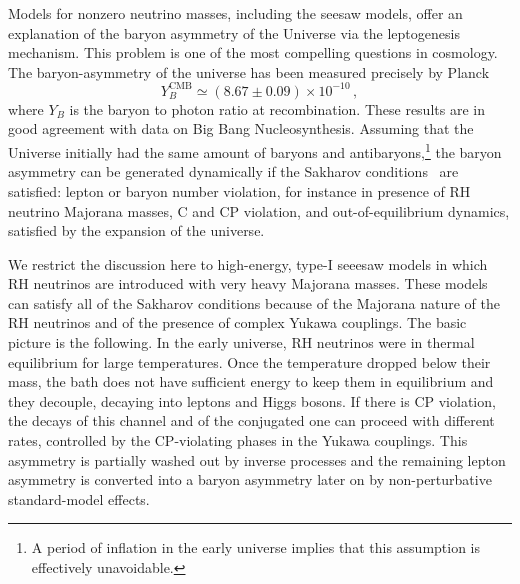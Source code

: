 Models for nonzero neutrino masses, including the seesaw models, offer an explanation of the baryon asymmetry of the Universe via the leptogenesis mechanism. 
This problem is one of the most compelling questions in cosmology. The baryon-asymmetry of the universe has been measured precisely by Planck~\cite{Aghanim:2018eyx}
\begin{equation}
Y_B^{\mathrm{CMB}}\simeq (8.67\pm 0.09) \times 10^{-10}\,,
\end{equation}
where $Y_B$ is the baryon to photon ratio at recombination. These results are in good agreement with data on Big Bang Nucleosynthesis. Assuming that the Universe initially had the same amount of baryons and antibaryons,\footnote{A period of inflation in the early universe implies that this assumption is effectively unavoidable.} the baryon asymmetry can be generated dynamically if the Sakharov conditions~\cite{Sakharov:1967dj} are satisfied: lepton or baryon number violation, for instance in presence of RH neutrino Majorana masses, C and CP violation, and out-of-equilibrium dynamics, satisfied by the expansion of the universe. 

We restrict the discussion here to high-energy, type-I seeesaw models in which RH neutrinos are introduced with very heavy Majorana masses. 
These models can satisfy all of the Sakharov conditions because of the Majorana nature of the RH neutrinos and of the presence of complex Yukawa couplings. The basic picture is the following. In the early universe, RH neutrinos were in thermal equilibrium for large temperatures. Once the temperature dropped below their mass, the bath does not have sufficient energy to keep them in equilibrium and they decouple, decaying into leptons and Higgs bosons. If there is CP violation, the decays of this channel and of the conjugated one can proceed with different rates, controlled by the CP-violating phases in the Yukawa couplings. 
This asymmetry is partially washed out by inverse processes and the remaining lepton asymmetry is converted into a baryon asymmetry later on by non-perturbative standard-model effects. 

